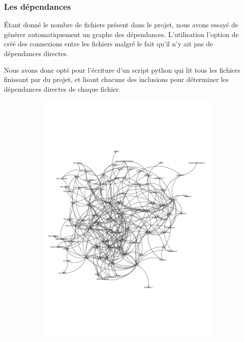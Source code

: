 \subsubsection*{Les dépendances}

Étant donné le nombre de fichiers présent dans le projet, nous avons essayé de générer automatiquement un graphe des dépendances. L'utilisation l'option  de  créé des connexions entre les fichiers malgré le fait qu'il n'y ait pas de dépendances directes.

Nous avons donc opté pour l'écriture d'un script python qui lit tous les fichiers finissant par  du projet, et lisant chacune des inclusions pour déterminer les dépendances directes de chaque fichier.


\begin{figure}[H]
   \begin{subfigure}[b]{0.45\textwidth}
        \includegraphics[width=\textwidth]{img/graph_fun.pdf}

\end{subfigure}
\end{figure}
